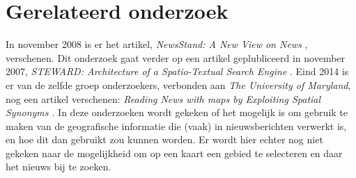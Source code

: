 \documentclass[twoside,openright]{uva-bachelor-thesis}
\begin{document}
\chapter{Gerelateerd onderzoek}
	\label{ch:related}
	In november 2008 is er het artikel, \textit{NewsStand: A New View on News} \cite{NewsStand2008}, verschenen. Dit onderzoek gaat verder op een artikel geplubliceerd in november 2007, \textit{STEWARD: Architecture of a Spatio-Textual Search Engine} \cite{STEWARD}. Eind 2014 is er van de zelfde groep onderzoekers, verbonden aan \textit{The University of Maryland}, nog een artikel verschenen: \textit{Reading News with maps by Exploiting Spatial Synonyms \cite{RNwMbESS}}. In deze onderzoeken wordt gekeken of het mogelijk is om gebruik te maken van de geografische informatie die (vaak) in nieuwsberichten verwerkt is, en hoe dit dan gebruikt zou kunnen worden. Er wordt hier echter nog niet gekeken naar de mogelijkheid om op een kaart een gebied te selecteren en daar het nieuws bij te zoeken.
\end{document}
